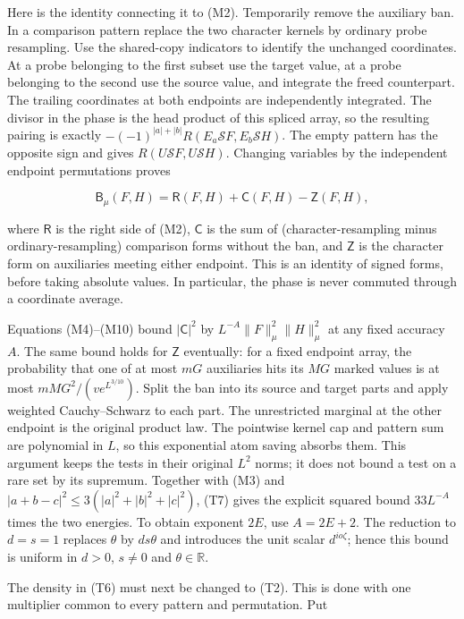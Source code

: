 Here is the identity connecting it to (M2). Temporarily remove the
auxiliary ban. In a comparison pattern replace the two character kernels
by ordinary probe resampling. Use the shared-copy indicators to identify
the unchanged coordinates. At a probe belonging to the first subset use
the target value, at a probe belonging to the second use the source
value, and integrate the freed counterpart. The trailing coordinates at
both endpoints are independently integrated. The divisor in the phase is
the head product of this spliced array, so the resulting pairing is
exactly \(-(-1)^{|a|+|b|}R(E_a\mathcal SF,E_b\mathcal SH)\). The empty
pattern has the opposite sign and gives
\(R(U\mathcal SF,U\mathcal SH)\). Changing variables by the independent
endpoint permutations proves

\[
\mathsf B_\mu(F,H)=\mathsf R(F,H)
              +\mathsf C(F,H)-\mathsf Z(F,H),
\tag{T7}
\]

where \(\mathsf R\) is the right side of (M2), \(\mathsf C\) is the sum
of (character-resampling minus ordinary-resampling) comparison forms
without the ban, and \(\mathsf Z\) is the character form on auxiliaries
meeting either endpoint. This is an identity of signed forms, before
taking absolute values. In particular, the phase is never commuted
through a coordinate average.

Equations (M4)--(M10) bound \(|\mathsf C|^2\) by
\(L^{-A}\|F\|_\mu^2\|H\|_\mu^2\) at any fixed accuracy \(A\). The same
bound holds for \(\mathsf Z\) eventually: for a fixed endpoint array,
the probability that one of at most \(mG\) auxiliaries hits its \(MG\)
marked values is at most \(mMG^2/(v e^{L^{3/10}})\). Split the ban into
its source and target parts and apply weighted Cauchy--Schwarz to each
part. The unrestricted marginal at the other endpoint is the original
product law. The pointwise kernel cap and pattern sum are polynomial in
\(L\), so this exponential atom saving absorbs them. This argument keeps
the tests in their original \(L^2\) norms; it does not bound a test on a
rare set by its supremum. Together with (M3) and
\(|a+b-c|^2\le3(|a|^2+|b|^2+|c|^2)\), (T7) gives the explicit squared
bound \(33L^{-A}\) times the two energies. To obtain exponent \(2E\),
use \(A=2E+2\). The reduction to \(d=s=1\) replaces \(\theta\) by
\(ds\theta\) and introduces the unit scalar \(d^{io\zeta}\); hence this
bound is uniform in \(d>0\), \(s\ne0\) and \(\theta\in\mathbb R\).

The density in (T6) must next be changed to (T2). This is done with one
multiplier common to every pattern and permutation. Put

